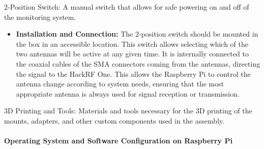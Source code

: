 \begin{list}{*}{}
	\item {2-Position Switch:} A manual switch that allows for safe powering on and off of the monitoring system.
	\begin{itemize}
		\item \textbf{Installation and Connection:} The 2-position switch should be mounted in the box in an accessible location. This switch allows selecting which of the two antennas will be active at any given time. It is internally connected to the coaxial cables of the SMA connectors coming from the antennas, directing the signal to the HackRF One. This allows the Raspberry Pi to control the antenna change according to system needs, ensuring that the most appropriate antenna is always used for signal reception or transmission.
	\end{itemize}
	\item {3D Printing and Tools:} Materials and tools necessary for the 3D printing of the mounts, adapters, and other custom components used in the assembly.
	
\end{list}

\paragraph{Operating System and Software Configuration on Raspberry Pi}

